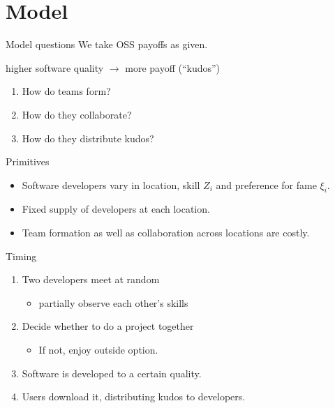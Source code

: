 \documentclass[
  ignorenonframetext,
  aspectratio=169,
]{beamer}
\providecommand{\tightlist}{%
  \setlength{\itemsep}{0pt}\setlength{\parskip}{0pt}}
\begin{document}
\section{Model}\label{model}

\begin{frame}{Model questions}
\protect\hypertarget{model-questions}{}
We take OSS payoffs as given.

higher software quality \(\to\) more payoff (``kudos'')

\begin{enumerate}
\tightlist
\item
  How do teams form?
\item
  How do they collaborate?
\item
  How do they distribute kudos?
\end{enumerate}
\end{frame}

\begin{frame}{Primitives}
\protect\hypertarget{primitives}{}
\begin{itemize}
\tightlist
\item
  Software developers vary in location, skill \(Z_i\) and preference for
  fame \(\xi_i\).
\item
  Fixed supply of developers at each location.
\item
  Team formation as well as collaboration across locations are costly.
\end{itemize}
\end{frame}

\begin{frame}{Timing}
\protect\hypertarget{timing}{}
\begin{enumerate}
\tightlist
\item
  Two developers meet at random

  \begin{itemize}
  \tightlist
  \item
    partially observe each other's skills
  \end{itemize}
\item
  Decide whether to do a project together

  \begin{itemize}
  \tightlist
  \item
    If not, enjoy outside option.
  \end{itemize}
\item
  Software is developed to a certain quality.
\item
  Users download it, distributing kudos to developers.
\end{enumerate}
\end{frame}
\end{document}
